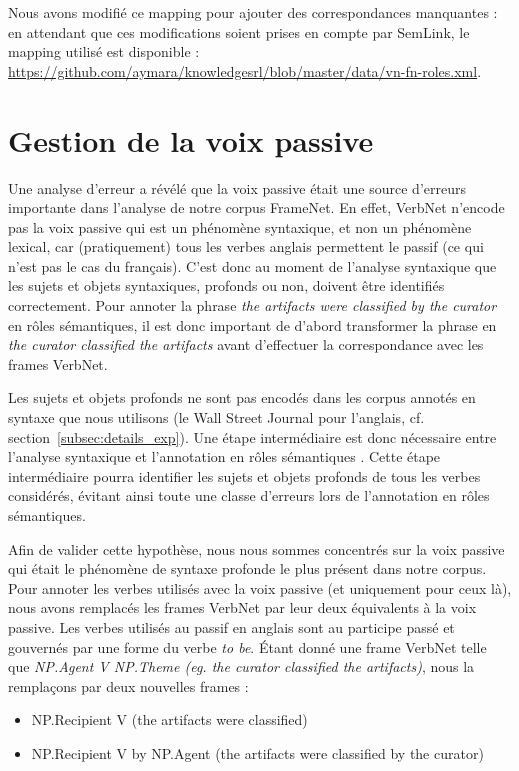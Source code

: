 Nous avons modifié ce mapping pour ajouter des correspondances manquantes : en
attendant que ces modifications soient prises en compte par SemLink, le mapping
utilisé est disponible :
\url{https://github.com/aymara/knowledgesrl/blob/master/data/vn-fn-roles.xml}.

\section{Gestion de la voix passive}
\label{sec:passif}

Une analyse d'erreur a révélé que la voix passive était une source d'erreurs
importante dans l'analyse de notre corpus FrameNet. En effet, VerbNet n'encode
pas la voix passive qui est un phénomène syntaxique, et non un phénomène
lexical, car (pratiquement) tous les verbes anglais permettent le passif (ce
qui n'est pas le cas du français). C'est donc au moment de l'analyse syntaxique
que les sujets et objets syntaxiques, profonds ou non, doivent être identifiés
correctement. Pour annoter la phrase \textit{the artifacts were classified by the
curator} en rôles sémantiques, il est donc important de d'abord transformer la
phrase en \textit{the curator classified the artifacts} avant d'effectuer la
correspondance avec les frames VerbNet.

Les sujets et objets profonds ne sont pas encodés dans les corpus annotés en
syntaxe que nous utilisons (le Wall Street Journal pour l'anglais, cf.
section~\ref{subsec:details_exp}). Une étape intermédiaire est donc nécessaire
entre l'analyse syntaxique et l'annotation en rôles sémantiques
\citep{bonfante2011modular, ribeyre2013systeme}. Cette étape intermédiaire
pourra identifier les sujets et objets profonds de tous les verbes considérés,
évitant ainsi toute une classe d'erreurs lors de l'annotation en rôles
sémantiques. 

Afin de valider cette hypothèse, nous nous sommes concentrés sur la voix
passive qui était le phénomène de syntaxe profonde le plus présent dans notre
corpus.  Pour annoter les verbes utilisés avec la voix passive (et uniquement
pour ceux là), nous avons remplacés les frames VerbNet par leur deux
équivalents à la voix passive. Les verbes utilisés au passif en anglais sont au
participe passé et gouvernés par une forme du verbe \textit{to be}. Étant donné
une frame VerbNet telle que \textit{NP.Agent V NP.Theme (eg. the
curator classified the artifacts)}, nous la remplaçons par deux nouvelles
frames :

\begin{itemize}
    \item NP.Recipient V (the artifacts were classified)
    \item NP.Recipient V by NP.Agent (the artifacts were classified by the curator)
\end{itemize}

